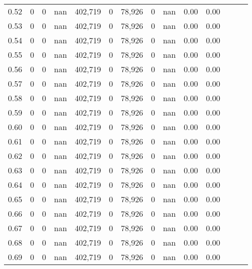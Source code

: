 \begin{tabular}{rrrrrrrrrrrrrr}
0.52 &        0 &       0 &   nan &  402,719 &        0 &  78,926 &       0 &   nan &  0.00 &      0.00 \\
0.53 &        0 &       0 &   nan &  402,719 &        0 &  78,926 &       0 &   nan &  0.00 &      0.00 \\
0.54 &        0 &       0 &   nan &  402,719 &        0 &  78,926 &       0 &   nan &  0.00 &      0.00 \\
0.55 &        0 &       0 &   nan &  402,719 &        0 &  78,926 &       0 &   nan &  0.00 &      0.00 \\
0.56 &        0 &       0 &   nan &  402,719 &        0 &  78,926 &       0 &   nan &  0.00 &      0.00 \\
0.57 &        0 &       0 &   nan &  402,719 &        0 &  78,926 &       0 &   nan &  0.00 &      0.00 \\
0.58 &        0 &       0 &   nan &  402,719 &        0 &  78,926 &       0 &   nan &  0.00 &      0.00 \\
0.59 &        0 &       0 &   nan &  402,719 &        0 &  78,926 &       0 &   nan &  0.00 &      0.00 \\
0.60 &        0 &       0 &   nan &  402,719 &        0 &  78,926 &       0 &   nan &  0.00 &      0.00 \\
0.61 &        0 &       0 &   nan &  402,719 &        0 &  78,926 &       0 &   nan &  0.00 &      0.00 \\
0.62 &        0 &       0 &   nan &  402,719 &        0 &  78,926 &       0 &   nan &  0.00 &      0.00 \\
0.63 &        0 &       0 &   nan &  402,719 &        0 &  78,926 &       0 &   nan &  0.00 &      0.00 \\
0.64 &        0 &       0 &   nan &  402,719 &        0 &  78,926 &       0 &   nan &  0.00 &      0.00 \\
0.65 &        0 &       0 &   nan &  402,719 &        0 &  78,926 &       0 &   nan &  0.00 &      0.00 \\
0.66 &        0 &       0 &   nan &  402,719 &        0 &  78,926 &       0 &   nan &  0.00 &      0.00 \\
0.67 &        0 &       0 &   nan &  402,719 &        0 &  78,926 &       0 &   nan &  0.00 &      0.00 \\
0.68 &        0 &       0 &   nan &  402,719 &        0 &  78,926 &       0 &   nan &  0.00 &      0.00 \\
0.69 &        0 &       0 &   nan &  402,719 &        0 &  78,926 &       0 &   nan &  0.00 &      0.00 \\

\end{tabular}
